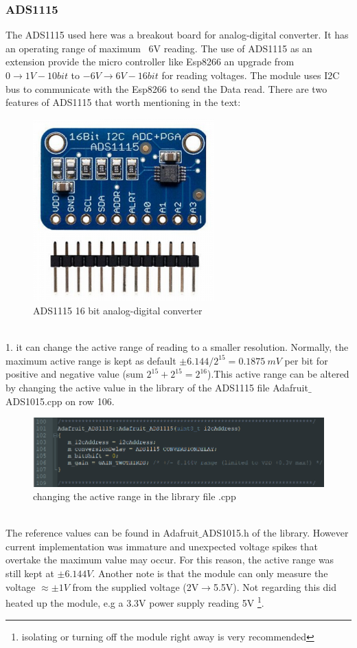 \documentclass[12 pt, a4paper]{thesis}
\begin{document}
\subsubsection{ADS1115}
The ADS1115 used here was a breakout board for analog-digital converter. It has an operating range of maximum ~6V reading. The use of ADS1115 as an extension provide the micro controller  like Esp8266 an upgrade from $0\rightarrow 1V-10bit$ to $-6V\rightarrow 6V-16bit$ for reading voltages. The module uses I2C bus to communicate with the Esp8266 to send the Data read. There are two features of ADS1115 that worth mentioning in the text:\\
\begin{figure}
\centering
\includegraphics[height = 70mm]{ADS1115_1.png}
\caption{ADS1115 16 bit analog-digital converter}
\end{figure}
\\
1. it can change the active range of reading to a smaller resolution. Normally, the maximum active range is kept as default $\pm 6.144/2^{15}=0.1875\: mV$ per bit for positive and negative value (sum $2^{15}+2^{15} = 2^{16}$).This active range can be altered by changing the active value in the library of the ADS1115 file Adafruit$\_$ADS1015.cpp on row 106.
\begin{figure}[hbt!]
\centering
\includegraphics[width = 150mm]{ADS1115_3.png}
\caption{changing the active range in the library file .cpp}
\end{figure}
\\The reference values can be found in Adafruit$\_$ADS1015.h of the library. However current implementation was immature and unexpected voltage spikes that overtake the maximum value may occur. For this reason, the active range was still kept at $\pm 6.144V$. Another note is that the module can only measure the voltage $\approx \pm 1V$ from the supplied voltage (2V$\rightarrow$5.5V). Not regarding this did heated up the module, e.g a 3.3V power supply reading 5V \footnote{isolating or turning off the module right away is very recommended}. 
\end{document}
